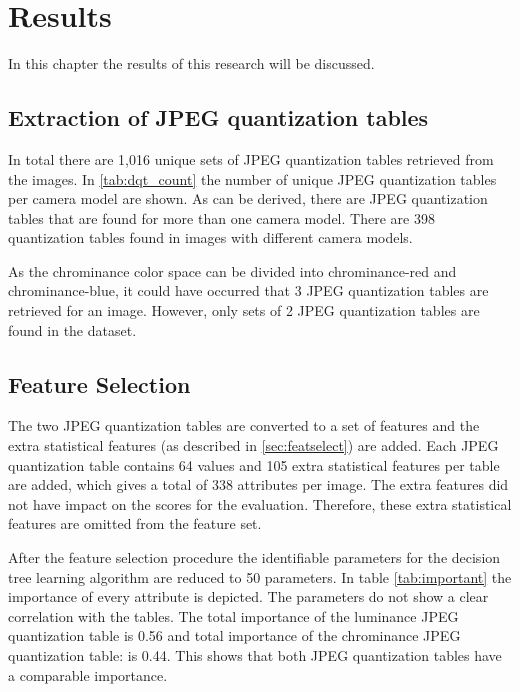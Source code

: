 
\chapter{Results} %

\label{ch:results} %

In this chapter the results of this research will be discussed. %

\section{Extraction of JPEG quantization tables}
In total there are 1,016 unique sets of JPEG quantization tables retrieved from the images. In \autoref{tab:dqt_count} the number of unique JPEG quantization tables per camera model are shown. As can be derived, there are JPEG quantization tables that are found for more than one camera model. There are 398 quantization tables found in images with different camera models. 

As the chrominance color space can be divided into chrominance-red and chrominance-blue, it could have occurred that 3 JPEG quantization tables are retrieved for an image. However, only sets of 2 JPEG quantization tables are found in the dataset.

\section{Feature Selection}
The two JPEG quantization tables are converted to a set of features and the extra statistical features (as described in \autoref{sec:featselect}) are added. Each JPEG quantization table contains 64 values and 105 extra statistical features per table are added, which gives a total of 338 attributes per image. The extra features did not have impact on the scores for the evaluation. Therefore, these extra statistical features are omitted from the feature set.

After the feature selection procedure the identifiable parameters for the decision tree learning algorithm are reduced to 50 parameters. In table \autoref{tab:important} the importance of every attribute is depicted. The parameters do not show a clear correlation with the tables. The total importance of the luminance JPEG quantization table is 0.56 and total importance of the chrominance JPEG quantization table: is 0.44. 
This shows that both JPEG quantization tables have a comparable importance.


